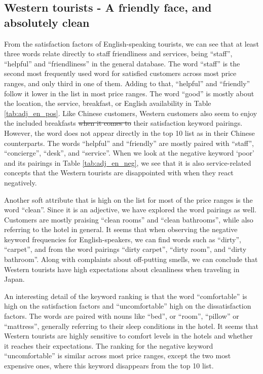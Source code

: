 \documentclass[smallextended,natbib]{svjour3}       %
\providecommand{\DIFadd}[1]{{\protect\color{blue}\uwave{#1}}} %
\providecommand{\DIFdel}[1]{{\protect\color{red}\sout{#1}}}                      %
\providecommand{\DIFaddbegin}{} %
\providecommand{\DIFaddend}{} %
\providecommand{\DIFdelbegin}{} %
\providecommand{\DIFdelend}{} %
\newcommand{\DIFscaledelfig}{0.5}
\newlength{\DIFdelgraphicswidth} %
\newlength{\DIFdelgraphicsheight} %
\newcommand{\DIFaddincludegraphics}[2][]{{\color{blue}\fbox{\DIFOincludegraphics[#1]{#2}}}} %
\newcommand{\DIFdelincludegraphics}[2][]{%
\sbox{\DIFdelgraphicsbox}{\DIFOincludegraphics[#1]{#2}}%
\settoboxwidth{\DIFdelgraphicswidth}{\DIFdelgraphicsbox} %
\settoboxtotalheight{\DIFdelgraphicsheight}{\DIFdelgraphicsbox} %
\scalebox{\DIFscaledelfig}{%
\parbox[b]{\DIFdelgraphicswidth}{\usebox{\DIFdelgraphicsbox}\\[-\baselineskip] \rule{\DIFdelgraphicswidth}{0em}}\llap{\resizebox{\DIFdelgraphicswidth}{\DIFdelgraphicsheight}{%
\setlength{\unitlength}{\DIFdelgraphicswidth}%
\begin{picture}(1,1)%
\thicklines\linethickness{2pt} %
{\color[rgb]{1,0,0}\put(0,0){\framebox(1,1){}}}%
{\color[rgb]{1,0,0}\put(0,0){\line( 1,1){1}}}%
{\color[rgb]{1,0,0}\put(0,1){\line(1,-1){1}}}%
\end{picture}%
}\hspace*{3pt}}} %
} %
\DeclareRobustCommand{\DIFaddbegin}{\DIFOaddbegin \let\includegraphics\DIFaddincludegraphics} %
\DeclareRobustCommand{\DIFaddend}{\DIFOaddend \let\includegraphics\DIFOincludegraphics} %
\DeclareRobustCommand{\DIFdelbegin}{\DIFOdelbegin \let\includegraphics\DIFdelincludegraphics} %
\DeclareRobustCommand{\DIFdelend}{\DIFOaddend \let\includegraphics\DIFOincludegraphics} %
\begin{document}
  \subsection{Western tourists - A friendly face, and absolutely clean}\label{disc:en}

    From the satisfaction factors of English-speaking tourists, we can see that at least three words relate directly to staff friendliness and services, being ``staff'', ``helpful'' and ``friendliness'' in the general database. The word ``staff'' is the second most frequently used word for satisfied customers across most price ranges, and only third in one of them. Adding to that, ``helpful'' and ``friendly'' follow it lower in the list in most price ranges. The word ``good'' is mostly about the location, the service, breakfast, or English availability in Table \ref{tab:adj_en_pos}. Like Chinese customers, Western customers also seem to enjoy the included breakfasts \DIFdelbegin \DIFdel{when it comes to }\DIFdelend \DIFaddbegin \DIFadd{regarding }\DIFaddend their satisfaction keyword pairings. However, the word does not appear directly in the top 10 list as in their Chinese counterparts. The words ``helpful'' and ``friendly'' are mostly paired with ``staff'', ``concierge'', ``desk'', and ``service''. When we look at the negative keyword ‘poor’ and its pairings in Table \ref{tab:adj_en_neg}, we see that it is also service-related concepts that the Western tourists are disappointed with when they react negatively.

    Another soft attribute that is high on the list for most of the price ranges is the word ``clean''. Since it is an adjective, we have explored the word pairings as well. Customers are mostly praising ``clean rooms'' and ``clean bathrooms'', while also referring to the hotel in general. It seems that when observing the negative keyword frequencies for English-speakers, we can find words such as ``dirty'', ``carpet'', and from the word pairings ``dirty carpet'', ``dirty room'', and ``dirty bathroom''. Along with complaints about off-putting smells, we can conclude that Western tourists have high expectations about cleanliness when traveling in Japan.

    An interesting detail of the keyword ranking is that the word ``comfortable'' is high on the satisfaction factors and ``uncomfortable'' high on the dissatisfaction factors. The words are paired with nouns like ``bed'', or ``room'', ``pillow'' or ``mattress'', generally referring to their sleep conditions in the hotel.
    It seems that Western tourists are highly sensitive to comfort levels in the hotels and whether it reaches their expectations. The ranking for the negative keyword ``uncomfortable'' is similar across most price ranges, except the two most expensive ones, where this keyword disappears from the top 10 list.
\end{document}
